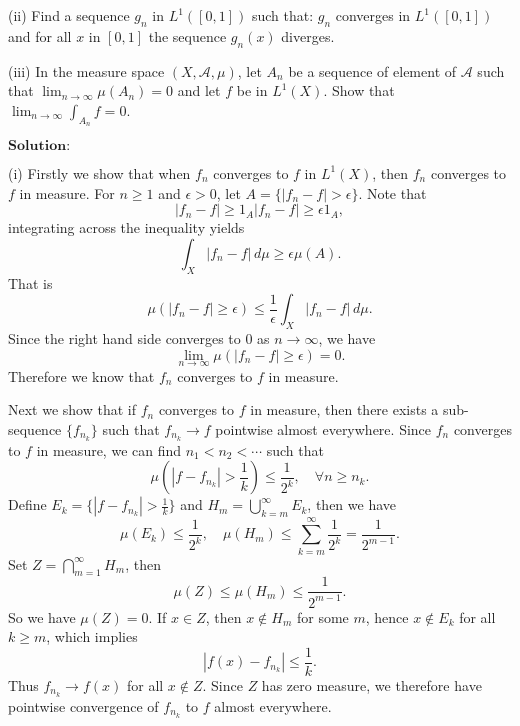 \documentclass[12pt,a4paper]{ctexart}
\begin{document}
(ii) Find a sequence $g_{n}$ in $L^{1}([0, 1])$ such that: $g_{n}$ converges in $L^{1}([0, 1])$ and for all $x$ in $[0, 1]$ the sequence $g_{n}(x)$ diverges.
\vspace{8pt}

(iii) In the measure space $(X, \mathcal{A}, \mu)$, let $A_{n}$ be a sequence of element of $\mathcal{A}$ such that $\lim_{n \to \infty} \mu(A_{n}) = 0$ and let $f$ be in $L^{1}(X)$. Show that $\lim_{n \to \infty} \int_{A_{n}} f = 0$. 

\vspace{8pt}

$\textbf{Solution:}$

(i) Firstly we show that when $f_{n}$ converges to $f$ in $L^{1}(X)$, then $f_{n}$ converges to $f$ in measure. For $n \geq 1$ and $\epsilon > 0$, let $A = \{|f_{n} - f| > \epsilon \}$. Note that
\begin{equation*}
    |f_{n} - f| \geq 1_{A}  |f_{n} - f| \geq \epsilon 1_{A},
\end{equation*}
integrating across the inequality yields
\begin{equation*}
    \int_{X} |f_{n} - f| \, d \mu \geq \epsilon \mu(A) .
\end{equation*}
That is
\begin{equation*}
    \mu(|f_{n} - f| \geq \epsilon) \leq \frac{1}{\epsilon} \int_{X} |f_{n} - f| \, d \mu.
\end{equation*}
Since the right hand side converges to $0$ as $n \to \infty$, we have
\begin{equation*}
    \lim_{n \to \infty} \mu(|f_{n} - f| \geq \epsilon) = 0.
\end{equation*}
Therefore we know that $f_{n}$ converges to $f$ in measure. 

Next we show that if $f_{n}$ converges to $f$ in measure, then there exists a sub-sequence $\{f_{n_{k}}\}$ such that $f_{n_{k}} \to f$ pointwise almost everywhere. Since $f_{n}$ converges to $f$ in measure, we can find $n_{1} < n_{2} < \cdots$ such that 
\begin{equation*}
    \mu(|f - f_{n_{k}}| > \frac{1}{k}) \leq \frac{1}{2^{k}}, \quad \forall n \geq n_{k}.
\end{equation*}
Define $E_{k} = \{|f - f_{n_{k}}| > \frac{1}{k}\}$ and $H_{m} = \bigcup_{k = m}^{\infty} E_{k}$, then we have
\begin{equation*}
    \mu(E_{k}) \leq \frac{1}{2^{k}}, \quad \mu(H_{m}) \leq \sum_{k = m}^{\infty} \frac{1}{2^{k}} = \frac{1}{2^{m-1}}.
\end{equation*}
Set $Z = \bigcap_{m = 1}^{\infty} H_{m}$, then
\begin{equation*}
    \mu(Z) \leq \mu(H_{m}) \leq \frac{1}{2^{m-1}}.
\end{equation*}
So we have $\mu(Z) = 0$. If $x \in Z$, then $x \notin H_{m}$ for some $m$, hence $x \notin E_{k}$ for all $k \geq m$, which implies
\begin{equation*}
    |f(x) - f_{n_{k}}| \leq \frac{1}{k}.
\end{equation*}
Thus $f_{n_{k}} \to f(x)$ for all $x \notin Z$. Since $Z$ has zero measure, we therefore have pointwise convergence of $f_{n_{k}}$ to $f$ almost everywhere. 
\end{document}
